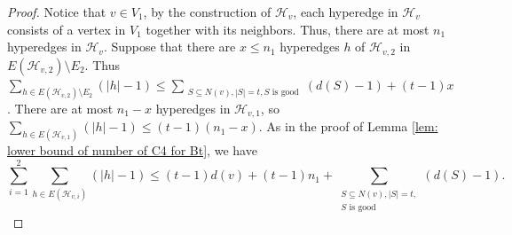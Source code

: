 \documentclass[11pt,a4paper]{article}
\theoremstyle{definition}
\newtheorem{claimthm}{Claim}[section]
\begin{document}
\begin{proof}
            Notice that $v \in V_1$,
            by the construction of $\mathcal{H}_v$, each hyperedge in $\mathcal{H}_v$ consists of a vertex in $V_1$ together with its neighbors.
            Thus, there are at most $n_1$ hyperedges in $\mathcal{H}_v$.
            Suppose that there are $x \leq n_1$ hyperedges $h$ of $\mathcal{H}_{v, 2}$ in $E(\mathcal{H}_{v, 2}) \setminus E_2$.
            Thus $\sum_{h \in E(\mathcal{H}_{v, 2}) \setminus E_2} (|h| - 1)  \leq  \sum_{\substack{S \subseteq N(v), |S| = t, S \text{ is good}}} (d(S) - 1) + (t-1)x$.
            There are at most $n_1-x$ hyperedges in $\mathcal{H}_{v, 1}$, so $\sum_{h \in E(\mathcal{H}_{v, 1})} (|h| - 1) \leq (t-1)(n_1 - x)$.
            As in the proof of Lemma \ref{lem: lower bound of number of C4 for Bt}, we have
            \begin{equation}\label{eq: lem2.2 2}
                \sum_{i = 1}^{2} \sum_{h \in E(\mathcal{H}_{v, i})} (|h| - 1) \leq (t-1)d(v) + (t-1)n_1 + \sum_{\substack{S \subseteq N(v), |S| = t, \\ S \text{ is good}}} (d(S) - 1).
            \end{equation}


\end{proof}
\end{document}
